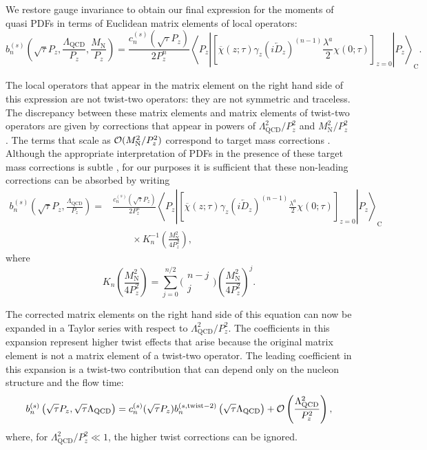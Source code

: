 We restore gauge invariance to obtain our final expression for the moments of 
quasi PDFs in terms of Euclidean matrix elements of local operators:
\begin{equation}
b_n^{(s)} \left(\sqrt{\tau}P_z,\frac{\Lambda_{\mathrm{QCD}}}{P_z}, 
\frac{M_\mathrm{N}}{P_z}\right) 
=\frac{c_n^{(s)}(\sqrt{\tau}P_z)}{2P_z^n}\left\langle 
P_z \left| \left[
\overline{\chi}(z;\tau)\gamma_z (i\overleftarrow{D}_z)^{(n-1)} 
\frac{\lambda^a}{2}\chi(0;\tau) \right ] _{z=0 }
\right|P_z\right\rangle_\mathrm{C} .
\end{equation}

The local operators that appear in the matrix element on the right hand side of 
this expression are not twist-two operators: they are not symmetric and 
traceless. The discrepancy between these matrix elements and matrix elements of 
twist-two operators are given by corrections  that appear in powers of 
$\Lambda_\mathrm{QCD}^2/{P_z^2}$ 
and $M_\mathrm{N}^2/P_z^2$ \cite{Lin:2014zya,Alexandrou:2015rja}. The terms 
that scale as ${\cal O}(M_\mathrm{N}^2/P_z^2)$ correspond to target mass 
corrections \cite{Nachtmann:1973ll,Georgi:1974sr}.  Although the appropriate 
interpretation 
of PDFs in the presence of these target mass corrections is subtle 
\cite{Steffens:2012jx,Monfared:2014nta}, for our purposes it is sufficient that 
these 
non-leading 
corrections can be absorbed 
by writing \cite{Lin:2014zya,Alexandrou:2015rja}
\begin{align}
b_n^{(s)} \left(\sqrt{\tau}P_z,\frac{\Lambda_{\mathrm{QCD}}}{P_z}\right) 
= {} & \frac{c_n^{(s)}(\sqrt{\tau}P_z)}{2P_z^n}\left\langle 
P_z \left|\left[
\overline{\chi}(z;\tau)\gamma_z (i\overleftarrow{D}_z)^{(n-1)} 
\frac{\lambda^a}{2}\chi(0;\tau) \right ] _{z=0 }
\right|P_z\right\rangle_\mathrm{C} \nonumber \\
{} & \qquad \times K_n^{-1}\left(\frac{M_\mathrm{N}^2}{4P_z^2}\right),
\end{align}
where
\begin{equation}
K_n\left(\frac{M_\mathrm{N}^2}{4P_z^2}\right) = \sum_{j=0}^{n/2} 
\bigg(
\begin{array}{c}
n-j \\
j
\end{array}
\bigg)
\left(\frac{M_\mathrm{N}^2}{4P_z^2}\right)^j.
\end{equation}

The corrected matrix 
elements on the right hand side of this equation can now 
be expanded in a Taylor series with respect to
$\Lambda_\mathrm{QCD}^2/P_z^2$. The coefficients in this expansion 
represent higher twist effects that arise because the original matrix 
element is not a matrix element of a twist-two operator. The leading 
coefficient 
in this expansion is a twist-two contribution that can depend only on the 
nucleon structure and the flow time:
\begin{equation}\label{eq:btwist}
b_n^{(s)} \left(\sqrt{\tau}P_z,\sqrt{\tau}\Lambda_{\mathrm{QCD}}\right)  
= 
c^{(s)}_n(\sqrt{\tau}P_z)b_n^{(s,\mathrm{twist}-2)}
\left(\sqrt{\tau}\Lambda_{\mathrm{
QCD}}\right)  +{\cal 
O}\left(\frac{\Lambda_\mathrm{QCD}^2}{P_z^2}\right),
\end{equation} 
where, for $\Lambda_\mathrm{QCD}^2/P_z^2\ll 1$, the higher twist corrections 
can be ignored.

